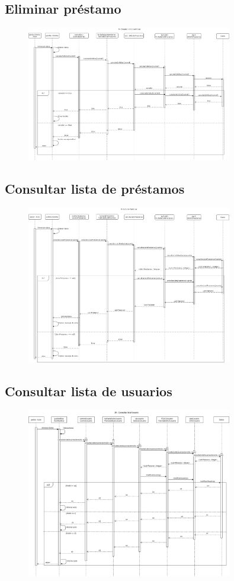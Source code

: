 \documentclass[12pt]{article}
\begin{document}
\subsection{Eliminar préstamo}
\begin{figure}[H]
    \centering
    \includegraphics[width=0.8\textwidth]{images/18-eliminarprestamos.png}
\end{figure}
\subsection{Consultar lista de préstamos}
\begin{figure}[H]
    \centering
    \includegraphics[width=0.8\textwidth]{images/19_consultar_prestamos.png}
\end{figure}
\subsection{Consultar lista de usuarios}
\begin{figure}[H]
    \centering
    \includegraphics[width=0.8\textwidth]{images/20-consultarlistausuarios.png}
\end{figure}
\end{document}
